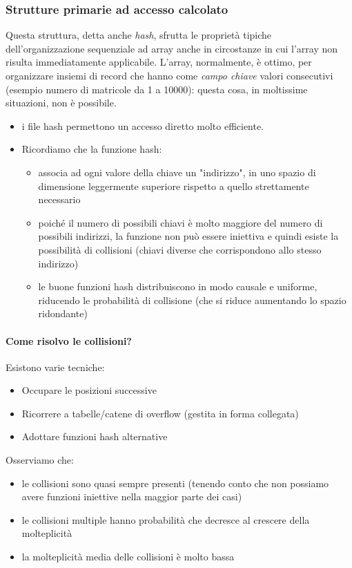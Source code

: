 \subsubsection{Strutture primarie ad accesso calcolato}
Questa struttura, detta anche \emph{hash}, sfrutta le proprietà tipiche dell'organizzazione sequenziale ad array anche in circostanze in cui l'array non risulta immediatamente applicabile. L'array, normalmente, è ottimo, per organizzare insiemi di record che hanno come \emph{campo chiave} valori consecutivi (esempio numero di matricole da 1 a 10000): questa cosa, in moltissime situazioni, non è possibile.
\begin{itemize}
	\item i file hash permettono un accesso diretto molto efficiente. 
	\item Ricordiamo che la funzione hash:
	\begin{itemize}
		\item associa ad ogni valore della chiave un "indirizzo", in uno spazio di
		dimensione leggermente superiore rispetto a quello
		strettamente necessario
		\item poiché il numero di possibili chiavi è molto maggiore del numero
		di possibili indirizzi, la funzione non può essere iniettiva e quindi
		esiste la possibilità di collisioni (chiavi diverse che corrispondono
		allo stesso indirizzo) 
		\item le buone funzioni hash distribuiscono in modo causale e uniforme,
		riducendo le probabilità di collisione (che si riduce aumentando
		lo spazio ridondante) 
	\end{itemize}
\end{itemize}
\paragraph{Come risolvo le collisioni?} Esistono varie tecniche:
\begin{itemize}
	\item Occupare le posizioni successive
	\item Ricorrere a tabelle/catene di overflow (gestita in forma collegata)
	\item Adottare funzioni hash alternative
\end{itemize}
Osserviamo che:
\begin{itemize}
	\item le collisioni sono quasi sempre presenti (tenendo conto che non possiamo avere funzioni iniettive nella maggior parte dei casi)
	\item le collisioni multiple hanno probabilità che decresce al crescere della molteplicità
	\item la molteplicità media delle collisioni è molto bassa
\end{itemize}
